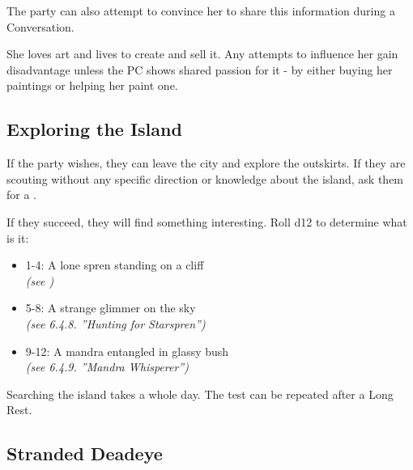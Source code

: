 The party can also attempt to convince her to share this information during a Conversation.


She loves art and lives to create and sell it. Any attempts to influence her gain disadvantage unless the PC shows shared passion for it - by either buying her paintings or helping her paint one.




\subsection{Exploring the Island}
\label{ssec:celebrantExplore}

If the party wishes, they can leave the city and explore the outskirts. If they are scouting without any specific direction or knowledge about the island, ask them for a . 

If they succeed, they will find something interesting. Roll d12 to determine what is it:

\begin{itemize}
	\item 1-4: A lone spren standing on a cliff \\ \textit{(see )} 
	\item 5-8: A strange glimmer on the sky \\ \textit{(see 6.4.8. ”Hunting for Starspren”)}
	\item 9-12: A mandra entangled in glassy bush \\ \textit{(see 6.4.9. ”Mandra Whisperer”)}
\end{itemize}

Searching the island takes a whole day. The test can be repeated after a Long Rest.




\subsection{Stranded Deadeye}
\label{ssec:celebrantDeadeye}

